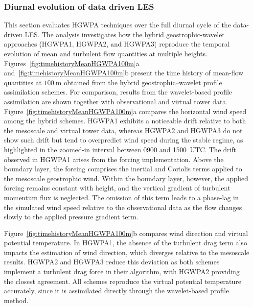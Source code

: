\subsubsection{Diurnal evolution of data driven LES}
This section evaluates HGWPA techniques over the full diurnal cycle of the data-driven LES. 
The analysis investigates how the hybrid geostrophic-wavelet approaches (HGWPA1, HGWPA2, and HGWPA3) reproduce the temporal evolution of mean and turbulent flow quantities at multiple heights.
Figures~\ref{fig:timehistoryMeanHGWPA100m}a and~\ref{fig:timehistoryMeanHGWPA100m}b present the time history of mean-flow quantities at $100~\mathrm{m}$ obtained from the hybrid geostrophic--wavelet profile assimilation schemes. For comparison, results from the wavelet-based profile assimilation are shown together with observational and virtual tower data. Figure~\ref{fig:timehistoryMeanHGWPA100m}a compares the horizontal wind speed among the hybrid schemes. HGWPA1 exhibits a noticeable drift relative to both the mesoscale and virtual tower data, whereas HGWPA2 and HGWPA3 do not show such drift but tend to overpredict wind speed during the stable regime, as highlighted in the zoomed-in interval between 0900 and 1500~UTC.
The drift observed in HGWPA1 arises from the forcing implementation. Above the boundary layer, the forcing comprises the inertial and Coriolis terms applied to the mesoscale geostrophic wind. Within the boundary layer, however, the applied forcing remains constant with height, and the vertical gradient of turbulent momentum flux is neglected. The omission of this term leads to a phase-lag in the simulated wind speed relative to the observational data as the flow changes slowly to the applied pressure gradient term. 


Figure~\ref{fig:timehistoryMeanHGWPA100m}b compares wind direction and virtual potential temperature. In HGWPA1, the absence of the turbulent drag term also impacts the estimation of wind direction, which diverges relative to the mesoscale results. HGWPA2 and HGWPA3 reduce this deviation as both schemes implement a turbulent drag force in their algorithm, with HGWPA2 providing the closest agreement. All schemes reproduce the virtual potential temperature accurately, since it is assimilated directly through the wavelet-based profile method.

